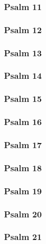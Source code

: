 \documentclass[10pt]{extarticle}
\begin{document}
\begin{multicols}{2}
\subsubsection{Psalm 11}

\newpage

\subsubsection{Psalm 12}

\newpage

\subsubsection{Psalm 13}

\newpage

\subsubsection{Psalm 14}

\newpage

\subsubsection{Psalm 15}

\newpage

\subsubsection{Psalm 16}

\newpage

\subsubsection{Psalm 17}

\newpage

\subsubsection{Psalm 18}

\newpage

\subsubsection{Psalm 19}

\newpage

\subsubsection{Psalm 20}

\newpage

\subsubsection{Psalm 21}

\newpage


\end{multicols}
\end{document}
